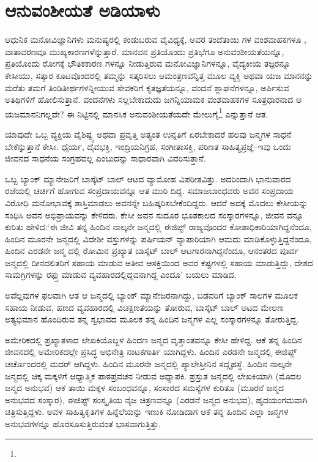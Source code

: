 \section{ಆನುವಂಶೀಯತೆ ಅಡಿಯಾಳು}

ಆಧುನಿಕ ಮನೋವಿಜ್ಞಾನಿಗಳು ಮನುಷ್ಯರಲ್ಲಿ ಕಂಡುಬರುವ ವೈವಿಧ್ಯಕ್ಕೆ, ಅವರ ತಂದೆತಾಯಿ ಗಳ ವಂಶವಾಹಕಗಳೂ , ವಾತಾವರಣವೂ ಮುಖ್ಯಕಾರಣಗಳೆನ್ನುತ್ತಾರೆ. ಮಾನವನ ಪ್ರತಿಯೊಂದು ಪ್ರತಿಭೆಗೂ ಅನುವಂಶೀಯತೆಯನ್ನೂ, ಪ್ರತಿಯೊಂದು ರೋಗಕ್ಕೆ ಭೌತಿಕಕಾರಣ ಗಳನ್ನೂ ನೀಡುತ್ತಿರುವ ಮನೋವಿಜ್ಞಾನಿಗಳನ್ನೂ, ವೈದ್ಯಕೀಯ ತಜ್ಞರನ್ನೂ ಕೇಸೀಯು, ಸತ್ಕಾರ ಕೂಟವೊಂದರಲ್ಲಿ ತಮ್ಮನ್ನು ಸತ್ಕರಿಸಲು ಆಮಂತ್ರಣವನ್ನಿತ್ತ ಮೂಲ ವ್ಯಕ್ತಿ ಅಥವಾ ಯಜ ಮಾನನನ್ನು ಮರೆತು ತಮಗೆ ತಿಂಡಿತೀರ್ಥಗಳನ್ನೀಯುವ ಸೇವಕರಿಗೆ ಕೃತಜ್ಞತೆಯನ್ನೂ, ವಂದನೆ ಶ್ಲಾಘನೆಗಳನ್ನೂ, ಅರ್ಪಿಸುವ ಅತಿಥಿಗಳಿಗೆ ಹೋಲಿಸುತ್ತಾನೆ. ವಂದನೆಗಳು ಸಲ್ಲಬೇಕಾದುದು ಜಗನ್ನಿಯಾಮಕ ವಂಶವಾಹಕಗಳ ಸೂತ್ರಧಾರನಾದ ಆ ಯಜಮಾನನಿಗಲ್ಲವೇ? ಈ ನಿಟ್ಟಿನಲ್ಲಿ ಮಾನಸಿಕ ಅನುವಂಶೀಯತೆಯದೇ ಮೇಲುಗೈ\footnote{} ಎನ್ನುತ್ತಾನೆ ಆತ.

ಯಾವುದೇ ಒಬ್ಬ ವ್ಯಕ್ತಿಯ ವೈಶಿಷ್ಟ್ಯ ಅಥವಾ ಪ್ರವೃತ್ತಿ ಅತ್ಯಂತ ಉನ್ನತಿಗೆ ಏರಬೇಕಾದರೆ ಹಲವು ಜನ್ಮಗಳ ಸಾಧನೆ ಬೇಕೆನ್ನುತ್ತಾನೆ ಕೇಸೀ. ಧೈರ್ಯ, ದೈವಭಕ್ತಿ, ಇಂದ್ರಿಯನಿಗ್ರಹ, ಸಂಗೀತಾಸಕ್ತಿ, ಪರಿಣತ ಸಾಹಿತ್ಯಪ್ರಜ್ಞೆ–ಇವು ಒಂದು ಜೀವನದ ಸಾಧನೆಯ ಸಂಗ್ರಹವಲ್ಲ ಎಂಬುದನ್ನು ಸಾಧಾರವಾಗಿ ವಿವರಿಸುತ್ತಾನೆ.

ಒಬ್ಬ ಬ್ಯಾಂಕ್ ಮ್ಯಾನೇಜರಿಗೆ ಬಾಸ್ಕೆಟ್ ಬಾಲ್ ಆಟದ ವ್ಯಾಮೋಹ ವಿಪರೀತವಿತ್ತು. ಅದರಿಂದಾಗಿ ಭಾನುವಾರದ ರಜೆಯಲ್ಲಿ ಚರ್ಚಿಗೆ ಹೋಗುವ ಸಂಪ್ರದಾಯವನ್ನೂ ಆತ ಮುರಿ ದಿದ್ದ. ಸಮಾಜಬಾಂಧವರು ಅವನ ಸಂಪ್ರದಾಯ ವಿರೋಧಿ ಮನೋಭಾವಕ್ಕೆ ಶಾಸ್ತಿಮಾಡಲು ಅವನನ್ನೇ ಬಹಿಷ್ಕರಿಸಬೇಕೆಂದಿದ್ದರು. ಆದರೆ ಅದಕ್ಕೆ ಮೊದಲು ಕೇಸೀಯನ್ನು ಸಂಧಿಸಿ ಅವನ ಅಭಿಪ್ರಾಯವನ್ನು ಕೇಳಿದರು. ಕೇಸೀ ಅವನ ಸುದೂರ ಭೂತಕಾಲದ ಸಂಸ್ಕಾರಗಳನ್ನೂ, ಜೀವನ ವನ್ನೂ ಕುರಿತು ಹೇಳಿದ:‘ಈ ಜೀವಿ ತನ್ನ ಹಿಂದಿನ ನಾಲ್ಕನೇ ಜನ್ಮದಲ್ಲಿ ಈಜಿಪ್ಟ್ ರಾಜ್ಯವೊಂದರ ಕೋಶಾಧಿಕಾರಿಯಾಗಿದ್ದನೆಂದೂ, ಹಿಂದಿನ ಮೂರನೇ ಜನ್ಮದಲ್ಲಿ ವಿದೇಶೀ ವಸ್ತುಗಳನ್ನು ಪರ್ಷಿಯನ್ ವ್ಯಾಪಾರಿಯಾಗಿ ಆಮದು ಮಾಡಿಕೊಳ್ಳುತ್ತಿದ್ದನೆಂದೂ, ಹಿಂದಿನ ಎರಡನೇ ಜನ್ಮ ದಲ್ಲಿ ರೋಮಿನ ಪ್ರಖ್ಯಾತ ಬಾಸ್ಕೆಟ್ ಬಾಲ್ ಆಟಗಾರನಾಗಿದ್ದನೆಂದೂ, ಆನಂತರದ ಪೂರ್ವ ಜನ್ಮದಲ್ಲಿ ದೀನದಲಿತರಿಗೆ ಸಹಾಯ ಮಾಡುವ ಅತೀವ ಆಸಕ್ತಿಯಿಂದ ಅವರ ಕಷ್ಟಗಳಲ್ಲಿ ಸಹಾಯ ಮಾಡುತ್ತಿದ್ದು, ದೇಶದ ಸಾಮಗ್ರಿಗಳನ್ನು ರಫ್ತು ಮಾಡುವ ವ್ಯವಹಾರದಲ್ಲಿದ್ದವನಾಗಿದ್ದ ಎಂದೂ’ ಬಯಲು ಮಾಡಿದ.

ಅವೆಲ್ಲವುಗಳ ಫಲವಾಗಿ ಆತ ಆ ಜನ್ಮದಲ್ಲಿ ಬ್ಯಾಂಕ್ ಮ್ಯಾನೇಜರನಾಗಿದ್ದು, ಬಡವರಿಗೆ ಬ್ಯಾಂಕ್ ಸಾಲಗಳ ಮೂಲಕ ಸಹಾಯ ನೀಡುವ, ಹಣದ ವ್ಯವಹಾರದಲ್ಲಿ ವಿಚಕ್ಷಣತೆಯನ್ನು ತೋರುವ, ಬಾಸ್ಕೆಟ್ ಬಾಲ್ ಆಟದ ಮೇಲಣ ಅತ್ಯಭಿಮಾನ ಹೊಂದಿರುವ ತನ್ನ ಸ್ವಭಾವದ ಮೂಲಕ ತನ್ನ ಹಿಂದಿನ ಜನ್ಮಗಳ ಎಲ್ಲ ಸಂಸ್ಕಾರಗಳನ್ನೂ ತೋರುತ್ತಿದ್ದ.

ಅಮೇರಿಕದಲ್ಲಿ ಪ್ರಖ್ಯಾತಳಾದ ಲೇಖಕಿಯೊಬ್ಬಳ ಹಿಂದಣ ಜನ್ಮದ ವೃತ್ತಾಂತವನ್ನೂ ಕೇಸೀ ಹೇಳಿದ್ದ. ಆಕೆ ತನ್ನ ಹಿಂದಿನ ಜೀವನದಲ್ಲಿ ಅಮೇರಿಕದಲ್ಲೇ ಪ್ರಸಿದ್ಧ ಅಭಿನೇತ್ರಿ ನಾಟಕಗಾರ್ತಿ ಯಾಗಿದ್ದಳು. ಹಿಂದಿನ ಎರಡನೇ ಜನ್ಮದಲ್ಲಿ ಈಜಿಪ್ಟ್ ಚರ್ಚೊಂದರಲ್ಲಿ ಮದರ್ ಆಗಿದ್ದಳು. ಹಿಂದಿನ ಮೂರನೇ ಜನ್ಮದಲ್ಲಿ ಪ್ಯಾಲೇಸ್ತೀನಿನ ಸದ್ಗೃಹಸ್ಥೆ. ಹಿಂದಿನ ನಾಲ್ಕನೇ ಜನ್ಮದಲ್ಲಿ ಚಿಕ್ಕ ಮಕ್ಕಳಿಗೆ ಆಧ್ಯಾತ್ಮಿಕ ಪಾಠಪ್ರವಚನ ನೀಡುವ ಅಧ್ಯಾಪಕಿ. ಪ್ರಸ್ತುತ ಜನ್ಮದಲ್ಲಿ ಲೇಖಕಿಯಾಗಿ (ಮೊದಲ ಜನ್ಮದ ಅನುಭವ) ಆಕೆ ತಾಯಿ ಮಕ್ಕಳ ಸಂಬಂಧವನ್ನೂ, ಸಂಸಾರದ ಸಮಸ್ಯೆಗಳ ಕುರಿತೂ (ಮೂರನೆ ಜನ್ಮದ ಅನುಭವದ ಸಂಸ್ಕಾರ), ಈಜಿಪ್ಟ್ ಸಂಸ್ಕೃತಿಯ ನೈಜ ಚಿತ್ರಣವನ್ನೂ (ಎರಡನೆ ಜನ್ಮದ ಅನುಭವ), ಹೃದಯಂಗಮವಾಗಿ ಚಿತ್ರಿಸುತ್ತಿದ್ದಳು. ಅವಳ ಸಾಹಿತ್ಯಕೃತಿಗಳ ಹಿನ್ನೆಲೆಯನ್ನು ಇಣುಕಿ ನೋಡಿದಾಗ ಆಕೆ ತನ್ನ ಹಿಂದಿನ ಎಲ್ಲಾ ಜನ್ಮಗಳ ಅನುಭವಗಳನ್ನೂ ಹೊರಸೂಸುತ್ತಿರುವಂತೆ ಭಾಸವಾಗುತ್ತಿತ್ತು.


